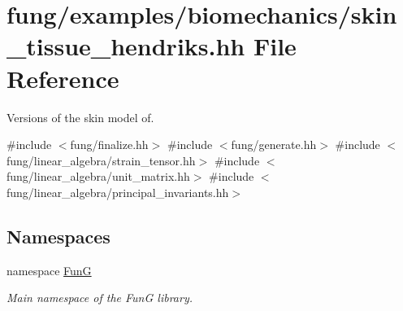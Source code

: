 \hypertarget{skin__tissue__hendriks_8hh}{\section{fung/examples/biomechanics/skin\-\_\-tissue\-\_\-hendriks.hh \-File \-Reference}
\label{skin__tissue__hendriks_8hh}
}


\-Versions of the skin model of.  


{\ttfamily \#include $<$fung/finalize.\-hh$>$}\*
{\ttfamily \#include $<$fung/generate.\-hh$>$}\*
{\ttfamily \#include $<$fung/linear\-\_\-algebra/strain\-\_\-tensor.\-hh$>$}\*
{\ttfamily \#include $<$fung/linear\-\_\-algebra/unit\-\_\-matrix.\-hh$>$}\*
{\ttfamily \#include $<$fung/linear\-\_\-algebra/principal\-\_\-invariants.\-hh$>$}\*
\subsection*{\-Namespaces}
\begin{DoxyCompactItemize}
\item 
namespace \hyperlink{namespaceFunG}{\-Fun\-G}
\begin{DoxyCompactList}\small\item\em \-Main namespace of the \-Fun\-G library. \end{DoxyCompactList}\end{DoxyCompactItemize}
